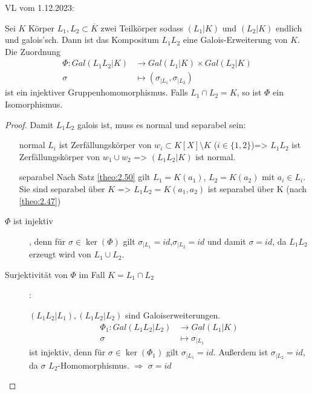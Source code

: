 \documentclass[../main.tex]{subfiles}
\begin{document}
\begin{flushright}
VL vom 1.12.2023:
\end{flushright}
\begin{theorem}[Produktsatz]
Sei $K$ Körper
    $L_1,L_2\subset \overline{K}$ zwei Teilkörper sodass $(L_1|K)$ und $(L_2|K)$ endlich und galois'sch.
    Dann ist das Kompositum $L_1L_2$ eine Galois-Erweiterung von $K$.
    Die Zuordnung 
    \begin{align*}
        \Phi\colon Gal(L_1L_2|K)&\rightarrow Gal(L_1|K)\times Gal(L_2|K)\\
        \sigma &\mapsto (\sigma_{|L_1},\sigma_{|L_2})
    \end{align*}
    ist ein injektiver Gruppenhomomorphismus.
    Falls $L_1\cap L_2 = K$, so ist $\Phi$ ein Isomorphismus.
\end{theorem}
\begin{proof}
    Damit $L_1L_2$ galois ist, muss es normal und separabel sein:
    \begin{itemize}
        \item[normal] $L_i$ ist Zerfällungskörper von $w_i\subset K[X]\setminus K$ ($i\in\{1,2\}$)=> $L_1L_2$ ist Zerfällungskörper von $w_1\cup w_2$ => $(L_1L_2|K)$ ist normal.
        \item[separabel] Nach Satz \ref{theo:2.50} gilt $L_1 = K(a_1)$, $L_2=K(a_2)$ mit $a_i\in L_i$.
        Sie sind separabel über $K$ => $L_1L_2 = K(a_1,a_2)$ ist separabel über K (nach \ref{theo:2.47})
    \end{itemize}

    \begin{description}
        \item[$\Phi$ ist injektiv], denn für $\sigma\in \ker(\Phi)$ gilt $\sigma_{|L_1} =id$,$\sigma_{|L_2} = id$ und damit $\sigma = id$, da $L_1L_2$ erzeugt wird von $L_1\cup L_2$.
        \item[Surjektivität von $\Phi$ im Fall $K = L_1\cap L_2$]:
        
        $(L_1L_2|L_1), (L_1L_2|L_2)$ sind Galoiserweiterungen.
        \begin{align*}
            \Phi_1: Gal(L_1L_2|L_2)&\rightarrow Gal(L_1|K)\\
            \sigma &\mapsto \sigma_{|L_1}
        \end{align*}
         ist injektiv, denn für $\sigma \in \ker(\Phi_1)$ gilt $\sigma_{|L_1} = id$.
        Außerdem ist $\sigma_{|L_2} = id$, da $\sigma$ $L_2$-Homomorphismus. $\Rightarrow$ $\sigma = id$
    

\end{description}
\end{proof}
\end{document}
